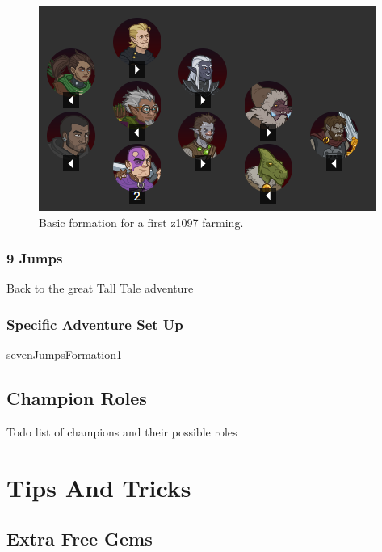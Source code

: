 \documentclass{article}
\begin{document}
\begin{figure}[h]
    \centering
    \includegraphics[width=\linewidth]{sevenJumpsFormation1}
    \caption{Basic formation for a first z1097 farming.}%
    \label{fig:sevenJumpsFormation1}
\end{figure}

\subsubsection{9 Jumps}

Back to the great Tall Tale adventure

\subsubsection{Specific Adventure Set Up}


sevenJumpsFormation1

\subsection{Champion Roles}

Todo list of champions and their possible roles



\section{Tips And Tricks}

\subsection{Extra Free Gems}
\end{document}
